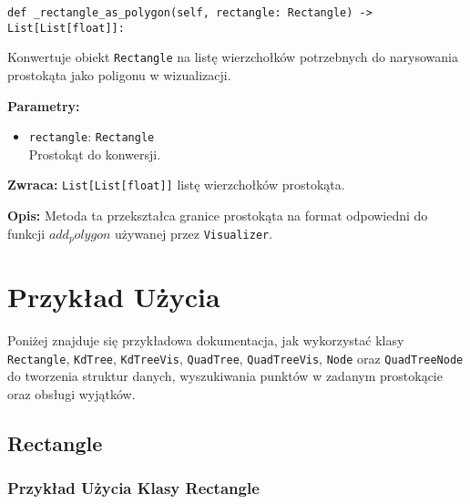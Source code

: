 \documentclass[12pt]{article}
\begin{document}
\begin{verbatim}
def _rectangle_as_polygon(self, rectangle: Rectangle) -> List[List[float]]:
\end{verbatim}

\noindent Konwertuje obiekt \texttt{Rectangle} na listę wierzchołków potrzebnych do narysowania prostokąta jako poligonu w wizualizacji.

\noindent\textbf{Parametry:}
\begin{itemize}
    \item \texttt{rectangle}: \texttt{Rectangle} \\
    Prostokąt do konwersji.
\end{itemize}

\textbf{Zwraca:} 
\texttt{List[List[float]]} listę wierzchołków prostokąta.

\textbf{Opis:} 
Metoda ta przekształca granice prostokąta na format odpowiedni do funkcji \texttt{$add_polygon$} używanej przez \texttt{Visualizer}.

\section{Przykład Użycia}

Poniżej znajduje się przykładowa dokumentacja, jak wykorzystać klasy \texttt{Rectangle}, \texttt{KdTree}, \texttt{KdTreeVis}, \texttt{QuadTree}, \texttt{QuadTreeVis}, \texttt{Node} oraz \texttt{QuadTreeNode} do tworzenia struktur danych, wyszukiwania punktów w zadanym prostokącie oraz obsługi wyjątków.

\subsection{Rectangle}


\subsubsection{Przykład Użycia Klasy Rectangle}
\end{document}
